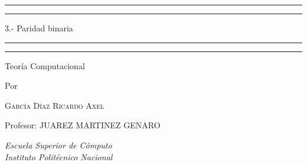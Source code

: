 \documentclass[a4paper, 12pt, oneside]{article}
\begin{document}
 

\begin{titlepage} 

	\centering 
	
	\scshape
	
	\vspace*{\baselineskip} 
	
	\rule{\textwidth}{1.6pt}\vspace*{-\baselineskip}\vspace*{2pt} 
	\rule{\textwidth}{0.4pt} 
	
	\vspace{0.75\baselineskip} 
	\date{12 Febrero 2018}
	{\LARGE 3.- Paridad binaria  \\} 
	
	\vspace{0.75\baselineskip} 
	
	\rule{\textwidth}{0.4pt}\vspace*{-\baselineskip}\vspace{3.2pt} 
	\rule{\textwidth}{1.6pt} 
	
	\vspace{2\baselineskip} 
	
	
	Teoría Computacional
	
	\vspace*{3\baselineskip} 
	
	
	Por
	
	\vspace{0.5\baselineskip} 
	
	{\scshape\Large García Díaz Ricardo Axel \\} 
    \vspace{2\baselineskip} 
    
    Profesor:  JUAREZ MARTINEZ GENARO 
    
	
	\vspace{15\baselineskip} 
	
	\textit{Escuela Superior de Cómputo \\ Instituto Politécnico Nacional} 
	



\end{titlepage}
\end{document}
